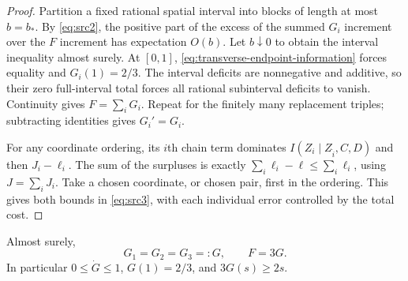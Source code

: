 \begin{proof}
Partition a fixed rational spatial interval into blocks of length
at most $b=b_*$.  By \eqref{eq:src2}, the positive part of the excess
of the summed $G_i$ increment over the $F$ increment has expectation
$O(b)$.  Let $b\downarrow0$ to obtain the interval inequality almost
surely.  At $[0,1]$, \eqref{eq:transverse-endpoint-information}
forces equality and $G_i(1)=2/3$.  The interval deficits are
nonnegative and additive, so their zero full-interval total forces
all rational subinterval deficits to vanish.  Continuity gives
$F=\sum_iG_i$.  Repeat for the finitely many replacement triples;
subtracting identities gives $G_i'=G_i$.

For any coordinate ordering, its $i$th chain term dominates
$I(Z_i\mid Z_{\widehat i},C,D)$ and then $J_i-\ell_i$.
The sum of the surpluses is exactly
$\sum_i\ell_i-\ell\le\sum_i\ell_i$, using $J=\sum_iJ_i$.
Take a chosen coordinate, or chosen pair, first in the ordering.
This gives both bounds in \eqref{eq:src3}, with each individual
error controlled by the total cost.
\end{proof}

\begin{lemma}\label{lem:transverse-common-profile}
Almost surely,
\begin{equation}\label{eq:src4}
 G_1=G_2=G_3=:G,\qquad F=3G.
\end{equation}
In particular $0\le\dot G\le1$, $G(1)=2/3$, and $3G(s)\ge2s$.
\end{lemma}

